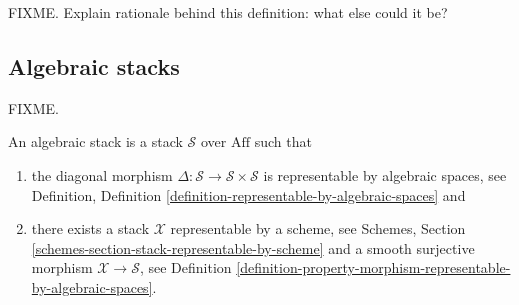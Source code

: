 \noindent
FIXME. Explain rationale behind this definition: what else could it be?


\subsection{Algebraic stacks}
\label{subsection-algebraic-stacks}

\noindent
FIXME.

\begin{definition}
An algebraic stack is a stack $\mathcal{S}$ over $\text{Aff}$ such that
\begin{enumerate}
\item the diagonal morphism
$\Delta : \mathcal{S} \to \mathcal{S}\times\mathcal{S}$
is representable by algebraic spaces, see Definition,
Definition \ref{definition-representable-by-algebraic-spaces} and
\item there exists a stack $\mathcal{X}$ representable by a scheme, see
Schemes, Section \ref{schemes-section-stack-representable-by-scheme}
and a smooth surjective morphism $\mathcal{X} \to \mathcal{S}$,
see Definition
\ref{definition-property-morphism-representable-by-algebraic-spaces}.
\end{enumerate}
\end{definition}







